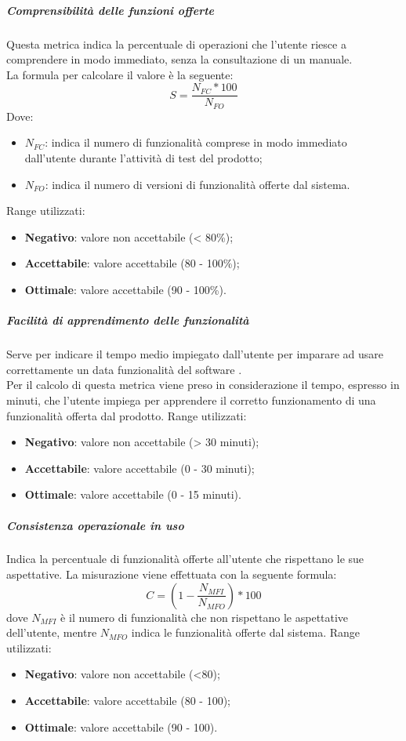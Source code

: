 \documentclass[../PianoDiQualifica.tex]{subfiles}
\begin{document}
			\subparagraph{Comprensibilità delle funzioni offerte}
			Questa metrica indica la percentuale di operazioni che l'utente riesce a comprendere in modo immediato, senza la consultazione di un manuale.\\La formula per calcolare il valore è la seguente:
			\begin{equation*}
				S = \frac{N_{FC}*100}{N_{FO}}
			\end{equation*}
			Dove:
			\begin{itemize}
				\item \textbf{$N_{FC}$}: indica il numero di funzionalità comprese in modo immediato dall'utente durante l'attività di test del prodotto;
				\item \textbf{$N_{FO}$}: indica il numero di versioni di funzionalità offerte dal sistema.
			\end{itemize}
			Range utilizzati:
			\begin{itemize}
				\item \textbf{Negativo}: valore non accettabile (< 80\%);
				\item \textbf{Accettabile}: valore accettabile (80 - 100\%);
				\item \textbf{Ottimale}: valore accettabile (90 - 100\%).
			\end{itemize}
			\subparagraph{Facilità di apprendimento delle funzionalità}
			Serve per indicare il tempo medio impiegato dall'utente per imparare ad usare correttamente un data funzionalità del software .\\
			Per il calcolo di questa metrica viene preso in considerazione il tempo, espresso in minuti, che l'utente impiega per apprendere il corretto funzionamento di una funzionalità offerta dal prodotto.
			Range utilizzati:
			\begin{itemize}
				\item \textbf{Negativo}: valore non accettabile (> 30 minuti);
				\item \textbf{Accettabile}: valore accettabile (0 - 30 minuti);
				\item \textbf{Ottimale}: valore accettabile (0 - 15 minuti).
			\end{itemize}
			\subparagraph{Consistenza operazionale in uso}
			Indica la percentuale di funzionalità offerte all'utente che rispettano le sue aspettative. La misurazione viene effettuata con la seguente formula:
			\begin{equation*}
				C = (1 - \frac{N_{MFI}}{N_{MFO}}) * 100
			\end{equation*}
			dove $	N_{MFI}$ è il numero di funzionalità che non rispettano le aspettative dell'utente, mentre $	N_{MFO}$ indica le funzionalità offerte dal sistema.
			Range utilizzati:
			\begin{itemize}
				\item \textbf{Negativo}: valore non accettabile (<80);
				\item \textbf{Accettabile}: valore accettabile (80 - 100);
				\item \textbf{Ottimale}: valore accettabile (90 - 100).
			\end{itemize}
\end{document}
